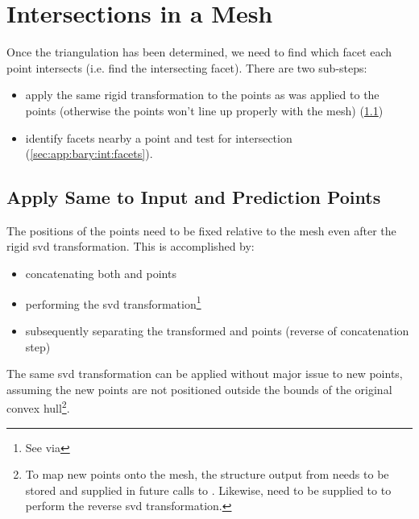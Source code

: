 \documentclass[final,12pt]{elsarticle}
\begin{document}
\section{Intersections in a Mesh}
\label{sec:app:bary:int}

Once the triangulation has been determined, we need to find which facet each \outpt{} point intersects (i.e. find the intersecting facet). There are two sub-steps:
\begin{itemize}%
	\item[2.1] apply the same rigid transformation to the \outpt{} points as was applied to the \inpt{} points (otherwise the \outpt{} points won't line up properly with the mesh) (\cref{sec:app:bary:int:out-svd})
	\item[2.2] identify facets nearby a \outpt{} point and test for intersection (\cref{sec:app:bary:int:facets}).
\end{itemize}
\subsection{Apply Same  to Input and Prediction Points}
\label{sec:app:bary:int:out-svd}
The positions of the \outpt{} points need to be fixed relative to the mesh even after the rigid \gls{svd} transformation. %
This is accomplished by:
\begin{itemize}%
	\item[2.1a] concatenating both \inpt{} and
	\outpt{} points
	\item[2.1b] performing the \gls{svd} transformation\footnote{See   via }
	\item[2.1c] subsequently separating the transformed \inpt{} and \outpt{} points (reverse of concatenation step)
\end{itemize}
%
The same \gls{svd} transformation can be applied without major issue to new points, assuming the new points are not positioned outside the bounds of the original convex hull\footnote{To map new points onto the mesh, the  structure output from  needs to be stored and supplied in future calls to . Likewise,  need to be supplied to  to perform the reverse \gls{svd} transformation.}.
%
\end{document}
